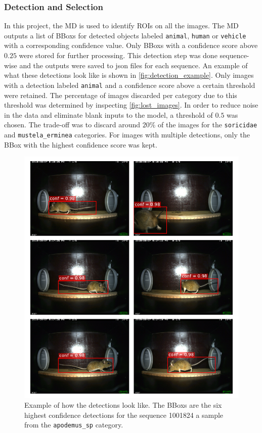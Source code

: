         \subsubsection{Detection and Selection}
        In this project, the \ac{MD} \autocite{morrisEfficientPipelineCamera2025} is used to identify \acsp{ROI} on all the images.
        The \ac{MD} outputs a list of \acp{BBox} for detected objects labeled \texttt{animal}, \texttt{human} or \texttt{vehicle} with a corresponding confidence value.
        Only \acp{BBox} with a confidence score above \(0.25\) were stored for further processing.
        This detection step was done sequence-wise and the outputs were saved to json files for each sequence.
        An example of what these detections look like is shown in \autoref{fig:detection_example}.
        Only images with a detection labeled \texttt{animal} and a confidence score above a certain threshold were retained.
        The percentage of images discarded per category due to this threshold was determined by inspecting \autoref{fig:lost_images}.
        In order to reduce noise in the data and eliminate blank inputs to the model, a threshold of \(0.5\) was chosen.
        The trade-off was to discard around \(20\%\) of the images for the \texttt{soricidae} and \texttt{mustela\_erminea} categories.
        For images with multiple detections, only the \ac{BBox} with the highest confidence score was kept.

        \begin{figure}[p]
        \centering
        \includegraphics{figures/detections_on_a_sequence.pdf}
        \caption{Example of how the detections look like. The \acsp{BBox} are the six highest confidence detections for the sequence 1001824 a sample from the \texttt{apodemus\_sp} category.}
        \label{fig:detection_example}
        \end{figure}

